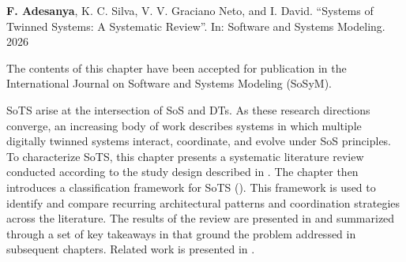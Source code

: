 \begin{publicationbox}{\resizebox{0.5cm}{!}{\faFileText}}
    \textbf{F. Adesanya}, K. C. Silva, V. V. Graciano Neto, and I. David. ``Systems of Twinned Systems: A Systematic Review''. In: Software and Systems Modeling. 2026

    \tcblower
    
    The contents of this chapter have been accepted for publication in the International Journal on Software and Systems Modeling (SoSyM).
\end{publicationbox}

SoTS arise at the intersection of SoS and DTs. As these research directions converge, an increasing body of work describes systems in which multiple digitally twinned systems interact, coordinate, and evolve under SoS principles. To characterize SoTS, this chapter presents a systematic literature review conducted according to the study design described in . The chapter then introduces a classification framework for SoTS (). This framework is used to identify and compare recurring architectural patterns and coordination strategies across the literature. The results of the review are presented in  and summarized through a set of key takeaways in  that ground the problem addressed in subsequent chapters. Related work is presented in .
